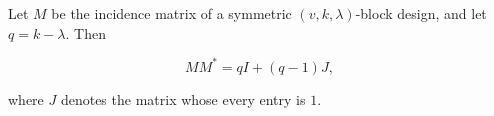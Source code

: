 Let $M$ be the incidence matrix of a symmetric $(v,k,\lambda)$-block design, and let $q = k - \lambda$. Then

$$MM^* = qI + (q - 1)J,$$

where $J$ denotes the matrix whose every entry is $1$.

